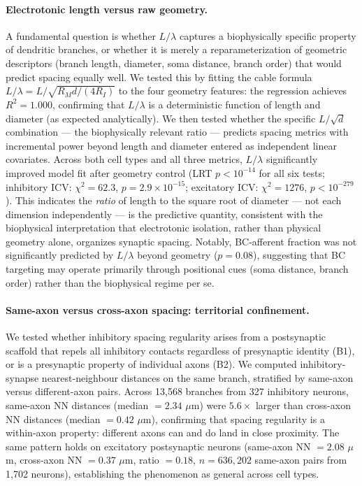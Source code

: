 \documentclass[11pt]{article}
\begin{document}
\paragraph{Electrotonic length versus raw geometry.}
A fundamental question is whether $L/\lambda$ captures a biophysically specific property of dendritic branches, or whether it is merely a reparameterization of geometric descriptors (branch length, diameter, soma distance, branch order) that would predict spacing equally well. We tested this by fitting the cable formula $L/\lambda = L / \sqrt{R_M d / (4R_I)}$ to the four geometry features: the regression achieves $R^2 = 1.000$, confirming that $L/\lambda$ is a deterministic function of length and diameter (as expected analytically). We then tested whether the specific $L/\sqrt{d}$ combination — the biophysically relevant ratio — predicts spacing metrics with incremental power beyond length and diameter entered as independent linear covariates. Across both cell types and all three metrics, $L/\lambda$ significantly improved model fit after geometry control (LRT $p < 10^{-14}$ for all six tests; inhibitory ICV: $\chi^2 = 62.3$, $p = 2.9 \times 10^{-15}$; excitatory ICV: $\chi^2 = 1276$, $p < 10^{-279}$). This indicates the \textit{ratio} of length to the square root of diameter — not each dimension independently — is the predictive quantity, consistent with the biophysical interpretation that electrotonic isolation, rather than physical geometry alone, organizes synaptic spacing. Notably, BC-afferent fraction was not significantly predicted by $L/\lambda$ beyond geometry ($p = 0.08$), suggesting that BC targeting may operate primarily through positional cues (soma distance, branch order) rather than the biophysical regime per se.

\paragraph{Same-axon versus cross-axon spacing: territorial confinement.}
We tested whether inhibitory spacing regularity arises from a postsynaptic scaffold that repels all inhibitory contacts regardless of presynaptic identity (B1), or is a presynaptic property of individual axons (B2). We computed inhibitory-synapse nearest-neighbour distances on the same branch, stratified by same-axon versus different-axon pairs. Across 13,568 branches from 327 inhibitory neurons, same-axon NN distances (median $= 2.34$ $\mu$m) were $5.6\times$ larger than cross-axon NN distances (median $= 0.42$ $\mu$m), confirming that spacing regularity is a within-axon property: different axons can and do land in close proximity. The same pattern holds on excitatory postsynaptic neurons (same-axon NN $= 2.08$ $\mu$m, cross-axon NN $= 0.37$ $\mu$m, ratio $= 0.18$, $n = 636{,}202$ same-axon pairs from 1,702 neurons), establishing the phenomenon as general across cell types.
\end{document}
